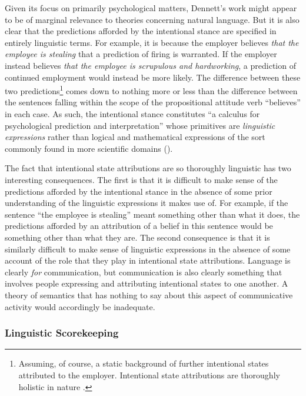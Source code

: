 Given its focus on primarily psychological matters, Dennett's work might appear to be of marginal relevance to theories concerning natural language. But it is also clear that the predictions afforded by the intentional stance are specified in entirely linguistic terms. For example, it is because the employer believes \textit{that the employee is stealing} that a prediction of firing is warranted. If the employer instead believes \textit{that the employee is scrupulous and hardworking}, a prediction of continued employment would instead be more likely. The difference between these two predictions\footnote{Assuming, of course, a static background of further intentional states attributed to the employer. Intentional state attributions are thoroughly holistic in nature \citep{Dennett:1987}.} comes down to nothing more or less than the difference between the sentences falling within the scope of the propositional attitude verb ``believes'' in each case. As such, the intentional stance constitutes ``a calculus for psychological prediction and interpretation'' whose primitives are \textit{linguistic expressions} rather than logical and mathematical expressions of the sort commonly found in more scientific domains (\citeyear[][p. 58]{Dennett:1987}).

The fact that intentional state attributions are so thoroughly linguistic has two interesting consequences. The first is that it is difficult to make sense of the predictions afforded by the intentional stance in the absence of some prior understanding of the linguistic expressions it makes use of. For example, if the sentence ``the employee is stealing'' meant something other than what it does, the predictions afforded by an attribution of a belief in this sentence would be something other than what they are. The second consequence is that it is similarly difficult to make sense of linguistic expressions in the absence of some account of the role that they play in intentional state attributions. Language is clearly \textit{for} communication, but communication is also clearly something that involves people expressing and attributing intentional states to one another. A theory of semantics that has nothing to say about this aspect of communicative activity would accordingly be inadequate. 

\subsubsection{Linguistic Scorekeeping}

